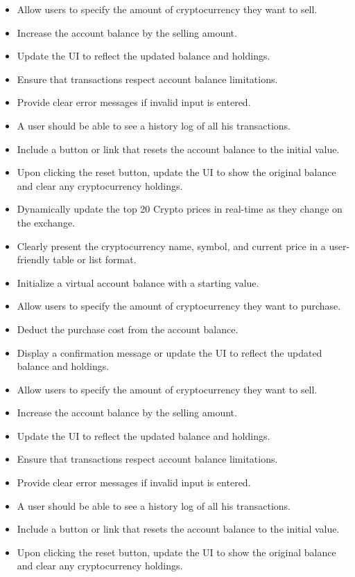 \documentclass[a4paper,12pt]{article}
\begin{document}
\begin{itemize}
    \item Allow users to specify the amount of cryptocurrency they want to sell.
    \item Increase the account balance by the selling amount.
    \item Update the UI to reflect the updated balance and holdings.
    \item Ensure that transactions respect account balance limitations.
    \item Provide clear error messages if invalid input is entered.
    \item A user should be able to see a history log of all his transactions.
    \item Include a button or link that resets the account balance to the initial value.
    \item Upon clicking the reset button, update the UI to show the original balance and clear any cryptocurrency holdings.
    \item Dynamically update the top 20 Crypto prices in real-time as they change on the exchange.
    \item Clearly present the cryptocurrency name, symbol, and current price in a user-friendly table or list format.
    \item Initialize a virtual account balance with a starting value.
    \item Allow users to specify the amount of cryptocurrency they want to purchase.
    \item Deduct the purchase cost from the account balance.
    \item Display a confirmation message or update the UI to reflect the updated balance and holdings.
    \item Allow users to specify the amount of cryptocurrency they want to sell.
    \item Increase the account balance by the selling amount.
    \item Update the UI to reflect the updated balance and holdings.
    \item Ensure that transactions respect account balance limitations.
    \item Provide clear error messages if invalid input is entered.
    \item A user should be able to see a history log of all his transactions.
    \item Include a button or link that resets the account balance to the initial value.
    \item Upon clicking the reset button, update the UI to show the original balance and clear any cryptocurrency holdings.
\end{itemize}
\end{document}
